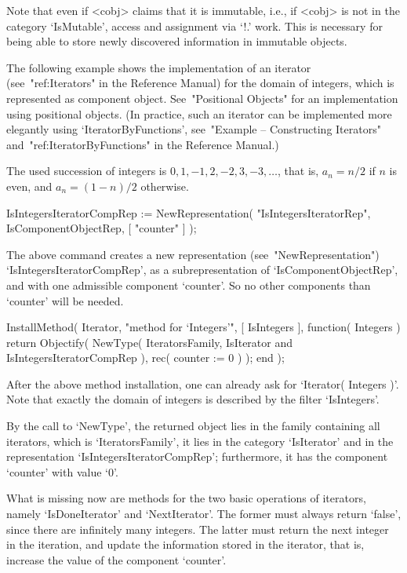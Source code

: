 Note that even if <cobj> claims that it is immutable, i.e., if <cobj>
is not in the category `IsMutable', access and assignment via `!.' work.
This is necessary for being able to store newly discovered information
in immutable objects.

The following example shows the implementation of an iterator
(see~"ref:Iterators" in the Reference Manual) for the domain of integers,
which is represented as component object.
See~"Positional Objects" for an implementation using positional objects.
(In practice, such an iterator can be implemented more elegantly using
`IteratorByFunctions', see~"Example -- Constructing Iterators"
and~"ref:IteratorByFunctions" in the {\GAP} Reference Manual.)

The used succession of integers is $0, 1, -1, 2, -2, 3, -3, \ldots$,
that is, $a_n = n/2$ if $n$ is even,
and $a_n = (1-n)/2$ otherwise.

\begintt
IsIntegersIteratorCompRep := NewRepresentation( "IsIntegersIteratorRep",
    IsComponentObjectRep, [ "counter" ] );
\endtt

The above command creates a new representation (see~"NewRepresentation")
`IsIntegersIteratorCompRep',
as a subrepresentation of `IsComponentObjectRep',
and with one admissible component `counter'.
So no other components than `counter' will be needed.

\begintt
InstallMethod( Iterator,
    "method for `Integers'",
    [ IsIntegers ],
    function( Integers )
    return Objectify( NewType( IteratorsFamily,
                                   IsIterator
                               and IsIntegersIteratorCompRep ),
                      rec( counter := 0 ) );
    end );
\endtt

After the above method installation, one can already ask for
`Iterator( Integers )'.
Note that exactly the domain of integers is described by
the filter `IsIntegers'.

By the call to `NewType', the returned object lies in the family
containing all iterators, which is `IteratorsFamily',
it lies in the category `IsIterator' and in the representation
`IsIntegersIteratorCompRep';
furthermore, it has the component `counter' with value `0'.

What is missing now are methods for the two basic operations
of iterators, namely `IsDoneIterator' and `NextIterator'.
The former must always return `false', since there are infinitely
many integers.
The latter must return the next integer in the iteration,
and update the information stored in the iterator,
that is, increase the value of the component `counter'.

